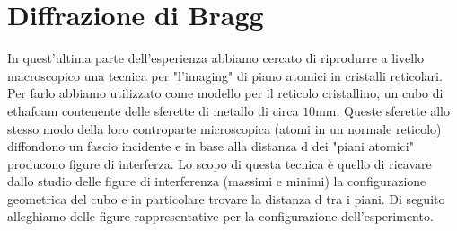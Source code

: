 \documentclass[letterpaper,12pt]{article}
\begin{document}
\section{Diffrazione di Bragg}
In quest'ultima parte dell'esperienza abbiamo cercato di riprodurre a livello macroscopico 
una tecnica per "l'imaging" di piano atomici in cristalli reticolari. Per farlo abbiamo utilizzato come modello per il reticolo cristallino, un cubo di ethafoam 
contenente delle sferette di metallo di circa $10$mm. Queste sferette allo stesso modo della loro controparte microscopica (atomi in un normale reticolo) diffondono un fascio incidente e in base alla distanza d dei "piani atomici" producono figure di interferza.
Lo scopo di questa tecnica è quello di ricavare dallo studio delle figure di interferenza (massimi e minimi) la configurazione geometrica del cubo e in particolare trovare la distanza d tra i piani.
Di seguito alleghiamo delle figure rappresentative per la configurazione dell'esperimento.
\end{document}
